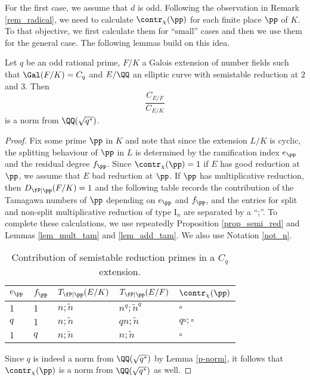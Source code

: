 For the first case, we assume that $d$ is odd. Following the observation in Remark \ref{rem_radical}, we need to calculate $\contr_\chi(\pp)$ for each finite place $\pp$ of $K$. To that objective, we first calculate them for ``small'' cases and then we use them for the general case. The following lemmas build on this idea.

\begin{lemma}\label{lem_Cp}
    Let $q$ be an odd rational prime, $F/K$ a Galois extension of number fields such that $\Gal(F/K)=C_q$ and $E/\QQ$ an elliptic curve with semistable reduction at $2$ and $3$. Then 
    $$\frac{C_{E/F}}{C_{E/K}}$$
    is a norm from $\QQ(\sqrt{q^*})$.
\end{lemma}

\begin{proof}
    Fix some prime $\pp$ in $K$ and note that since the extension $L/K$ is cyclic, the splitting behaviour of $\pp$ in $L$ is determined by the ramification index $e_\pp$ and the residual degree $f_\pp$. Since $\contr_\chi(\pp)=1$ if $E$ has good reduction at $\pp$, we assume that $E$ bad reduction at $\pp$. If $\pp$ has multiplicative reduction, then $D_{\fP\mid\pp}(F/K)=1$ and the following table records the contribution of the Tamagawa numbers of $\pp$ depending on $e_\pp$ and $f_\pp$, and the entries for split and non-split multiplicative reduction of type $\mathrm{I}_n$ are separated by a ``;''. To complete these calculations, we use repeatedly Proposition \ref{prop_semi_red} and Lemmas \ref{lem_mult_tam} and \ref{lem_add_tam}. We also use Notation \ref{not_n}.

    \begin{table}[!ht]
        \centering
        \begin{tabular}{|l|l|l|l|l|}
        \hline
        $e_\pp$ & $f_\pp$  & $T_{\fP\mid \pp}(E/K)$ & $T_{\fP\mid \pp}(E/F)$  & $\contr_\chi(\pp)$ \\ \hline
        $1$ & $1$ & $n;\tilde{n}$ & $n^q;\tilde{n}^q$ & $\square$ \\ \hline
        $q$ & $1$ & $n;\tilde{n}$ & $qn;\tilde{n}$ & $q\square;\square$ \\ \hline
        $1$ & $q$ & $n;\tilde{n}$ & $n;\tilde{n}$ & $\square$ \\ \hline
        \end{tabular}
        \caption{Contribution of semistable reduction primes in a $C_q$ extension.}
        \label{table_Cp}
    \end{table}

    Since $q$ is indeed a norm from $\QQ(\sqrt{q^*})$ by Lemma \ref{p-norm}, it follows that $\contr_\chi(\pp)$ is a norm from $\QQ(\sqrt{q^*})$ as well.


\end{proof}
